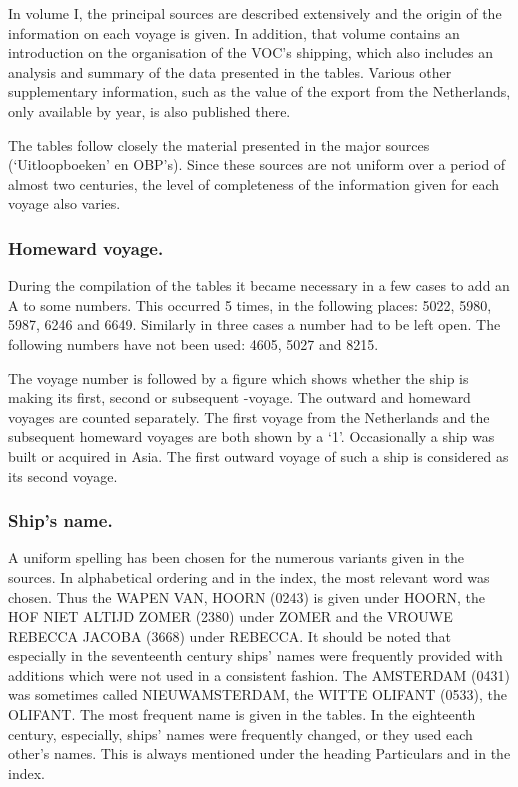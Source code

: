 \documentclass[10pt,twocolumn,fleqn]{article}
\begin{document}
In volume I, the principal sources are described extensively and the origin 
of the information on each voyage is given. In addition, that volume 
contains an introduction on the organisation of the VOC's shipping, 
which also includes an analysis and summary of the data presented in the tables.
Various other supplementary information, such as the value of the export 
from the Netherlands, only available by year, is also published there.

The tables follow closely the material presented in the major sources 
(`Uitloopboeken' en OBP's). Since these sources are not uniform over a 
period of almost two centuries, the level of completeness of the 
information given for each voyage also varies.

\subsubsection*{Homeward voyage.}
During the compilation of the tables it became necessary in a few cases 
to add an A to some numbers. This occurred 5 times, in the following places:
5022, 5980, 5987, 6246 and 6649. 
Similarly in three cases a number had to be left open. 
The following numbers have not been used: 4605, 5027 and 8215.

The voyage number is followed by a figure which shows whether the ship is 
making its first, second or subsequent -voyage. The outward and homeward 
voyages are counted separately. The first voyage from the Netherlands and 
the subsequent homeward voyages are both shown by a `1'.
Occasionally a ship was built or acquired in Asia. The first outward voyage 
of such a ship is considered as its second voyage. 

\subsubsection{Ship's name.}
A uniform spelling has been chosen for the numerous variants given in the 
sources. In alphabetical ordering and in the index, the most relevant word 
was chosen. Thus the WAPEN VAN, HOORN (0243) is given under HOORN, 
the HOF NIET ALTIJD ZOMER (2380) under ZOMER and the 
VROUWE REBECCA JACOBA (3668) under REBECCA. It should be noted that especially 
in the seventeenth century ships' names were frequently provided 
with additions which were not used in a consistent fashion. 
The AMSTERDAM (0431) was sometimes called NIEUWAMSTERDAM, the WITTE OLIFANT 
(0533), the OLIFANT. The most frequent name is given in the tables. 
In the eighteenth century, especially, ships' names were frequently changed, 
or they used each other's names. This is always mentioned under the heading 
Particulars and in the index.
\end{document}
